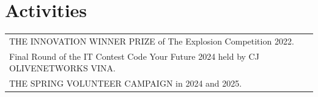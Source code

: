 \documentclass[a4paper,12pt]{article}
\begin{document}
\section{Activities}
\begin{tabularx}{\linewidth}{@{}l X@{}}
THE INNOVATION WINNER PRIZE of The Explosion Competition 2022. \vspace{0.1cm} \\
Final Round of the IT Contest Code Your Future 2024 held by CJ OLIVENETWORKS VINA. \vspace{0.1cm} \\
THE SPRING VOLUNTEER CAMPAIGN in 2024 and 2025. \\
\end{tabularx}

\vfill
\end{document}
